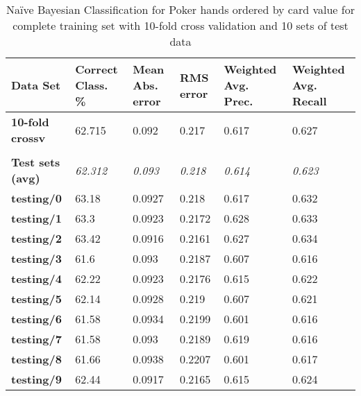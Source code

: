 \documentclass[10pt, a4paper]{article}
\begin{document}
\begin{table}[htbp]
  \centering
  \begin{tabular}{p{3cm}p{1.5cm}p{1.5cm}p{1.5cm}p{1.5cm}p{1.5cm}}
    \toprule
    \textbf{Data Set} & Correct Class. \% & Mean Abs. error & RMS error & Weighted Avg. Prec. & Weighted Avg. Recall \\
    \midrule
    \textbf{10-fold crossv} & 62.715 & 0.092 & 0.217 & 0.617 & 0.627 \\
    \textbf{} &       &       &       &       &  \\
    \textbf{Test sets (avg)} & \textit{62.312} & \textit{0.093} & \textit{0.218} & \textit{0.614} & \textit{0.623} \\
    \textbf{   testing/0} & 63.18 & 0.0927 & 0.218 & 0.617 & 0.632 \\
    \textbf{   testing/1} & 63.3  & 0.0923 & 0.2172 & 0.628 & 0.633 \\
    \textbf{   testing/2} & 63.42 & 0.0916 & 0.2161 & 0.627 & 0.634 \\
    \textbf{   testing/3} & 61.6  & 0.093 & 0.2187 & 0.607 & 0.616 \\
    \textbf{   testing/4} & 62.22 & 0.0923 & 0.2176 & 0.615 & 0.622 \\
    \textbf{   testing/5} & 62.14 & 0.0928 & 0.219 & 0.607 & 0.621 \\
    \textbf{   testing/6} & 61.58 & 0.0934 & 0.2199 & 0.601 & 0.616 \\
    \textbf{   testing/7} & 61.58 & 0.093 & 0.2189 & 0.619 & 0.616 \\
    \textbf{   testing/8} & 61.66 & 0.0938 & 0.2207 & 0.601 & 0.617 \\
    \textbf{   testing/9} & 62.44 & 0.0917 & 0.2165 & 0.615 & 0.624 \\
    \bottomrule
    \end{tabular}%
\caption{Na\"ive Bayesian Classification for Poker hands ordered by card value for complete training set with 10-fold cross validation and 10 sets of test data}   
  \label{tab:nbocresults}%
\end{table}%
\end{document}

